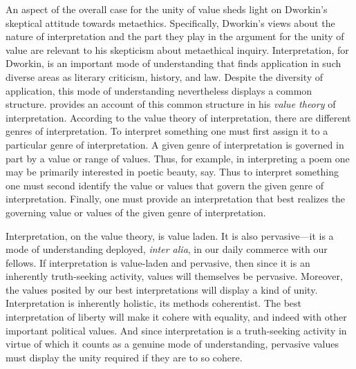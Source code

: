 \documentclass[12pt]{article}
\begin{document}
An aspect of the overall case for the unity of value sheds light on Dworkin's skeptical attitude towards metaethics. Specifically, Dworkin's views about the nature of interpretation and the part they play in the argument for the unity of value are relevant to his skepticism about metaethical inquiry. Interpretation, for Dworkin, is an important mode of understanding that finds application in such diverse areas as literary criticism, history, and law. Despite the diversity of application, this mode of understanding nevertheless displays a common structure. \citet[130--134]{Dworkin:2011fk} provides an account of this common structure in his \emph{value theory} of interpretation. According to the value theory of interpretation, there are different genres of interpretation. To interpret something one must first assign it to a particular genre of interpretation. A given genre of interpretation is governed in part by a value or range of values. Thus, for example, in interpreting a poem one may be primarily interested in poetic beauty, say. Thus to interpret something one must second identify the value or values that govern the given genre of interpretation. Finally, one must provide an interpretation that best realizes the governing value or values of the given genre of interpretation. 

Interpretation, on the value theory, is value laden. It is also pervasive---it is a mode of understanding deployed, \emph{inter alia}, in our daily commerce with our fellows. If interpretation is value-laden and pervasive, then since it is an inherently truth-seeking activity, values will themselves be pervasive. Moreover, the values posited by our best interpretations will display a kind of unity. Interpretation is inherently holistic, its methods coherentist. The best interpretation of liberty will make it cohere with equality, and indeed with other important political values. And since interpretation is a truth-seeking activity in virtue of which it counts as a genuine mode of understanding, pervasive values must display the unity required if they are to so cohere.


 
 
\end{document}
